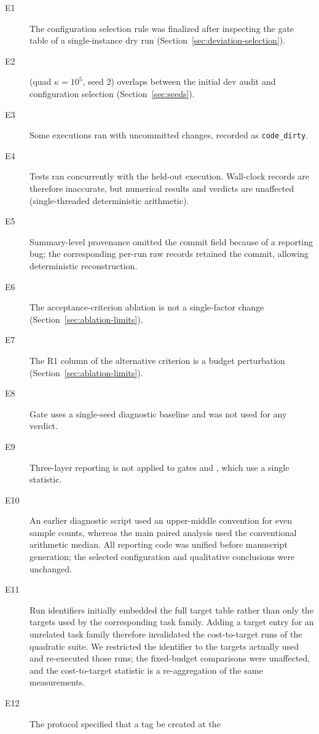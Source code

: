 \begin{description}
  \item[E1] The configuration selection rule was finalized after inspecting the gate
    table of a single-instance dry run (Section~\ref{sec:deviation-selection}).
  \item[E2] (quad $\kappa{=}10^5$, seed 2) overlaps between the initial dev audit and
    configuration selection (Section~\ref{sec:seeds}).
  \item[E3] Some executions ran with uncommitted changes, recorded as
    \texttt{code\_dirty}.
  \item[E4] Tests ran concurrently with the held-out execution. Wall-clock records are
    therefore inaccurate, but numerical results and verdicts are unaffected
    (single-threaded deterministic arithmetic).
  \item[E5] Summary-level provenance omitted the commit field because of a reporting
    bug; the corresponding per-run raw records retained the commit, allowing
    deterministic reconstruction.
  \item[E6] The acceptance-criterion ablation is not a single-factor change
    (Section~\ref{sec:ablation-limits}).
  \item[E7] The R1 column of the alternative criterion is a budget perturbation
    (Section~\ref{sec:ablation-limits}).
  \item[E8] Gate  uses a single-seed diagnostic baseline and was not used for
    any verdict.
  \item[E9] Three-layer reporting is not applied to gates  and ,
    which use a single statistic.
  \item[E10] An earlier diagnostic script used an upper-middle convention for even
    sample counts, whereas the main paired analysis used the conventional arithmetic
    median. All reporting code was unified before manuscript generation; the selected
    configuration and qualitative conclusions were unchanged.
  \item[E11] Run identifiers initially embedded the full target table rather than only
    the targets used by the corresponding task family. Adding a target entry for an
    unrelated task family therefore invalidated the cost-to-target runs of the
    quadratic suite. We restricted the identifier to the targets actually used and
    re-executed those runs; the fixed-budget comparisons were unaffected, and the
    cost-to-target statistic is a re-aggregation of the same measurements.
  \item[E12] The protocol specified that a tag be created at the

\end{description}
